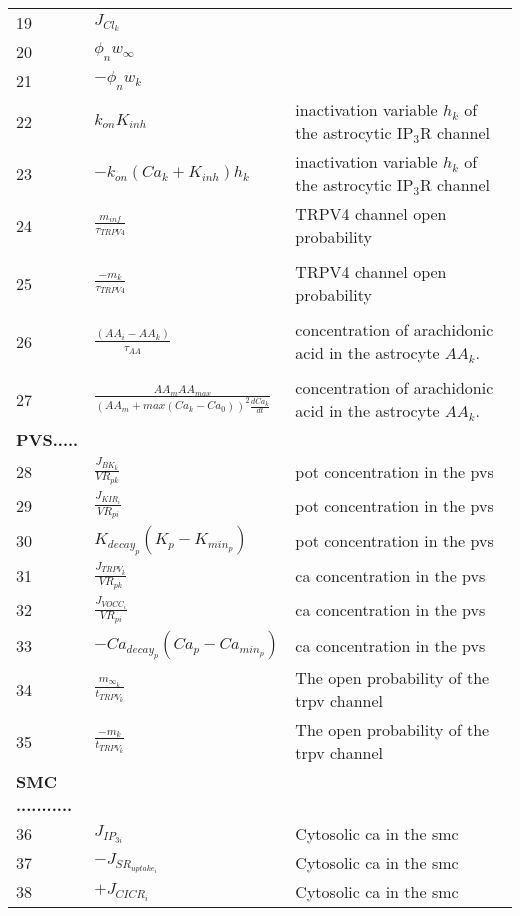 \documentclass[]{article}
\newcommand{\pot}{\gls{pot}\xspace}
\newcommand{\ca}{\gls{ca}\xspace}
\begin{document}
\begin{longtable}[h!] { p{0.12\linewidth}  p{0.28\linewidth}     p{0.6\linewidth} }
19	& 	   $J_{Cl_k}$ & \\
20  & 	   $\phi_n  w_{\infty} $ & \\
21	& 	   $-\phi_n w_k$ & \\
22	& 	  $k_{on}  K_{inh}  $ & inactivation variable $h_k$ of the astrocytic IP$_3$R channel\\
23	& 	   $- k_{on}(Ca_k + K_{inh}) h_k$ & inactivation variable $h_k$ of the astrocytic IP$_3$R channel\\
24	& 	   $\frac{m_{inf}}{\tau_{TRPV4}}$ & TRPV4 channel open probability \\
	& 	     & \\
25	& 	   $\frac{-m_k}{\tau_{TRPV4}}$ & TRPV4 channel open probability  \\
	& 	    & \\
26	& 	   $\frac{(AA_i - AA_k)}{\tau_{AA}}$ & concentration of arachidonic acid in the astrocyte $AA_k$.\\
	& 	    & \\ 
27	& 	   $\frac{AA_m  AA_{max}}{(AA_m + max(Ca_k - Ca_0))^2 \frac{dCa_k}{dt}} $ & concentration of arachidonic acid in the astrocyte $AA_k$.\\
 \textbf{PVS.....}& & \\
28  &    $\frac{J_{BK_k}}{VR_{pk}}$ & \pot concentration in the \gls{pvs}\\
29 &    $\frac{J_{KIR_i}}{VR_{pi}}$ & \pot concentration in the \gls{pvs}\\
30 &    $K_{decay_p} (K_p - K_{min_p})$ & \pot concentration in the \gls{pvs}\\
31 &    $\frac{J_{TRPV_k}}{VR_{pk}}$ &\ca concentration in the \gls{pvs}  \\
32 &    $\frac{J_{VOCC_i}}{VR_{pi}} $ & \ca concentration in the \gls{pvs} \\
33 &    $- Ca_{decay_p} ( Ca_p - Ca_{min_p} ) $ &  \ca concentration in the \gls{pvs}\\
34 &    $\frac{m_{\infty_k} }{t_{TRPV_k}}  $ & The open probability of the \gls{trpv} channel\\
35 &    $\frac{- m_k}{t_{TRPV_k}} $ &The open probability of the \gls{trpv} channel \\
 \textbf{SMC ...........} &      &\\
36 &    $ J_{IP_{3i}} $ & Cytosolic \ca in the \gls{smc}\\
37 &    $- J_{SR_{uptake_{i}}} $ & Cytosolic \ca in the \gls{smc}\\
38 &    $ + J_{CICR_{i}}$ & Cytosolic \ca in the \gls{smc} \\

\end{longtable}
\end{document}
